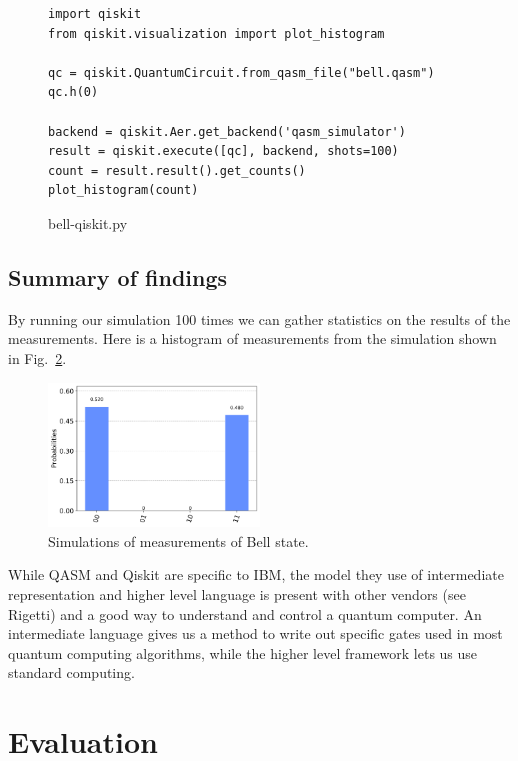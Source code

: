 \documentclass[conference]{IEEEtran}
\begin{document}
\begin{samepage}
\begin{figure}[htbp]
\begin{verbatim}
import qiskit
from qiskit.visualization import plot_histogram

qc = qiskit.QuantumCircuit.from_qasm_file("bell.qasm")
qc.h(0)

backend = qiskit.Aer.get_backend('qasm_simulator')
result = qiskit.execute([qc], backend, shots=100)
count = result.result().get_counts()
plot_histogram(count)
\end{verbatim}
\caption{bell-qiskit.py}
\label{fig:qiskit}
\end{figure}
\end{samepage}

\subsection{Summary of findings}
By running our simulation 100 times we can gather statistics on the results of the measurements. Here is a histogram of measurements from the simulation shown in Fig.~\ref{fig:results}.

\begin{figure}[H]
    \centering
    \includegraphics[width=0.5\textwidth]{histogram.png}
    \caption{Simulations of measurements of Bell state.}
    \label{fig:results}
\end{figure}

While QASM and Qiskit are specific to IBM, the model they use of intermediate representation and higher level language is present with other vendors (see Rigetti) and a good way to understand and control a quantum computer. An intermediate language gives us a method to write out specific gates used in most quantum computing algorithms, while the higher level framework lets us use standard computing. 


\section{Evaluation}
\end{document}
